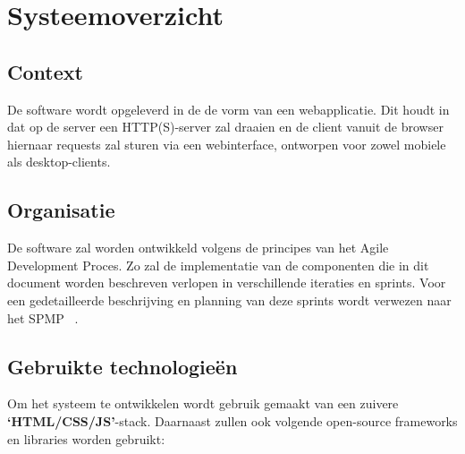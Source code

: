 \documentclass{article}
\begin{document}
\clearpage

\section{Systeemoverzicht}

\subsection{Context}

De software wordt opgeleverd in de de vorm van een webapplicatie. Dit houdt in dat op de server een HTTP(S)-server zal draaien en de client vanuit de browser hiernaar requests zal sturen via een webinterface, ontworpen voor zowel mobiele als desktop-clients.

\subsection{Organisatie}

De software zal worden ontwikkeld volgens de principes van het Agile Development Proces. Zo zal de implementatie van de componenten die in dit document worden beschreven verlopen in verschillende iteraties en sprints. Voor een gedetailleerde beschrijving en planning van deze sprints wordt verwezen naar het SPMP ~\cite{Xtreport:SPMP}.

\subsection{Gebruikte technologie\"en}

Om het systeem te ontwikkelen wordt gebruik gemaakt van een zuivere \textbf{`HTML/CSS/JS'}-stack.
Daarnaast zullen ook volgende open-source frameworks en libraries worden gebruikt:
\end{document}
